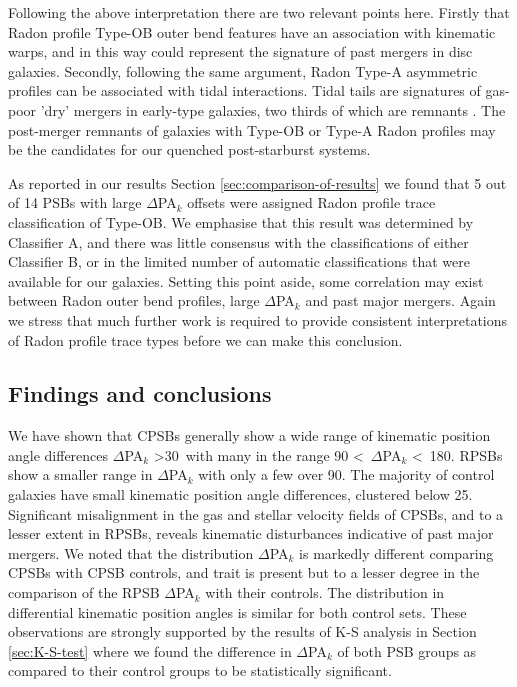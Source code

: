 Following the above interpretation there are two relevant points here. Firstly that Radon profile Type-OB outer bend features have an association with kinematic warps, and in this way could represent the signature of past mergers in disc galaxies. Secondly, following the same argument, Radon Type-A asymmetric profiles can be associated with tidal interactions. Tidal tails are signatures of gas-poor 'dry' mergers in early-type galaxies, two thirds of which are remnants \citep{2005AJ....130.2647V}. The post-merger remnants of galaxies with Type-OB or Type-A Radon profiles may be the candidates for our quenched post-starburst systems.

As reported in our results Section \ref{sec:comparison-of-results} we found that 5 out of 14 PSBs with large $\Delta$PA$_{k}$ offsets were assigned Radon profile trace classification of Type-OB. We emphasise that this result was determined by Classifier A, and there was little consensus with the classifications of either Classifier B, or in the limited number of automatic classifications that were available for our galaxies. Setting this point aside, some correlation may exist between Radon outer bend profiles, large $\Delta$PA$_{k}$ and past major mergers. Again we stress that much further work is required to provide consistent interpretations of Radon profile trace types before we can make this conclusion.

\subsection{Findings and conclusions}
\label{findings}

We have shown that CPSBs generally show a wide range of kinematic position angle differences $\Delta$PA$_{k}$ \textgreater 30\textdegree\ with many in the range 90 \textless\ $\Delta$PA$_{k}$ \textless\ 180\textdegree. RPSBs show a smaller range in $\Delta$PA$_{k}$ with only a few over 90\textdegree. The majority of control galaxies have small kinematic position angle differences, clustered below 25\textdegree. Significant misalignment in the gas and stellar velocity fields of CPSBs, and to a lesser extent in RPSBs, reveals kinematic disturbances indicative of past major mergers.
We noted that the distribution $\Delta$PA$_{k}$ is markedly different comparing CPSBs with CPSB controls, and trait is present but to a lesser degree in the comparison of the RPSB $\Delta$PA$_{k}$ with their controls. The distribution in differential kinematic position angles is similar for both control sets. These observations are strongly supported by the results of K-S analysis in Section \ref{sec:K-S-test} where we found the difference in $\Delta$PA$_{k}$ of both PSB groups as compared to their control groups to be statistically significant. 

